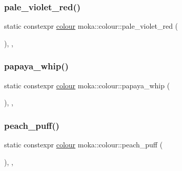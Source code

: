 \mbox{\label{classmoka_1_1colour_ad1eb86dfd7ae69aff716e8382b485fb8}} 
\subsubsection{\texorpdfstring{pale\_violet\_red()}{pale\_violet\_red()}}
{\footnotesize\ttfamily static constexpr \mbox{\hyperlink{classmoka_1_1colour}{colour}} moka\+::colour\+::pale\+\_\+violet\+\_\+red (\begin{DoxyParamCaption}{ }\end{DoxyParamCaption})\hspace{0.3cm}{\ttfamily [inline]}, {\ttfamily [static]}, {\ttfamily [noexcept]}}

\mbox{\label{classmoka_1_1colour_af2a0d1b024940bd4e96aa2a3646ee3e3}} 
\subsubsection{\texorpdfstring{papaya\_whip()}{papaya\_whip()}}
{\footnotesize\ttfamily static constexpr \mbox{\hyperlink{classmoka_1_1colour}{colour}} moka\+::colour\+::papaya\+\_\+whip (\begin{DoxyParamCaption}{ }\end{DoxyParamCaption})\hspace{0.3cm}{\ttfamily [inline]}, {\ttfamily [static]}, {\ttfamily [noexcept]}}

\mbox{\label{classmoka_1_1colour_a3deed650e8a98223fa851c43bfed4b30}} 
\subsubsection{\texorpdfstring{peach\_puff()}{peach\_puff()}}
{\footnotesize\ttfamily static constexpr \mbox{\hyperlink{classmoka_1_1colour}{colour}} moka\+::colour\+::peach\+\_\+puff (\begin{DoxyParamCaption}{ }\end{DoxyParamCaption})\hspace{0.3cm}{\ttfamily [inline]}, {\ttfamily [static]}, {\ttfamily [noexcept]}}


